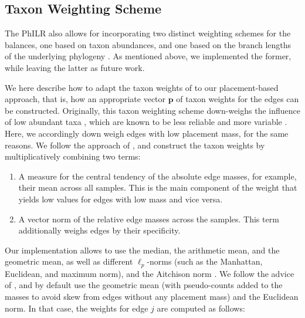 

\subsection{Taxon Weighting Scheme}
\label{ch:Balances:sec:Methods:sub:EdgeWeights}

The PhILR also allows for incorporating two distinct weighting schemes for the balances,
one based on taxon abundances, and one based on the branch lengths of the underlying phylogeny \cite{Silverman2017}.
As mentioned above, we implemented the former, while leaving the latter as future work.

We here describe how to adapt the taxon weights of  to our placement-based approach,
that is, how an appropriate vector $\bm{p}$ of taxon weights for the edges can be constructed.
Originally, this taxon weighting scheme down-weighs the influence of low abundant taxa \cite{Silverman2017},
which are known to be less reliable and more variable \cite{Good1956}.
Here, we accordingly down weigh edges with low placement mass, for the same reasons.
We follow the approach of , and construct the taxon weights by multiplicatively combining two terms:

\begin{enumerate}
    \item A measure for the central tendency of the absolute edge masses, for example, their mean across all samples.
          This is the main component of the weight that yields low values for edges with low mass and vice versa.
    \item A vector norm of the relative edge masses across the samples.
          This term additionally weighs edges by their specificity.
\end{enumerate}

Our implementation allows to use the median, the arithmetic mean, and the geometric mean,
as well as different $\ell_p$-norms (such as the Manhattan, Euclidean, and maximum norm),
and the Aitchison norm \cite{Pawlowsky-Glahn2015}.
We follow the advice of \cite{Silverman2017}, and by default use the geometric mean
(with pseudo-counts added to the masses to avoid skew from edges without any placement mass) and the Euclidean norm.
In that case, the weights for edge $j$ are computed as follows:

